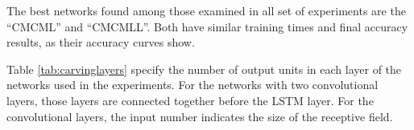 The best networks found among those examined in all set of experiments are the ``CMCML'' and ``CMCMLL''. Both have similar training times and final accuracy results, as their accuracy curves show. 

Table \ref{tab:carvinglayers} specify the number of output units in each layer of the networks used in the experiments. For the networks with two convolutional layers, those layers are connected together before the LSTM layer. For the convolutional layers, the input number indicates the size of the receptive field. 
